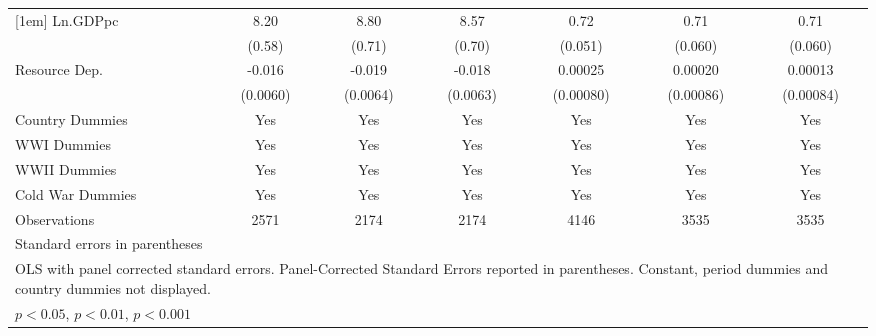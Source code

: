 \begin{table}[htbp]
{\begin{tabular}{l*{6}{c}}
			[1em]
			Ln.GDPpc            &        8.20\sym{***}&        8.80\sym{***}&        8.57\sym{***}&        0.72\sym{***}&        0.71\sym{***}&        0.71\sym{***}\\
			&      (0.58)         &      (0.71)         &      (0.70)         &     (0.051)         &     (0.060)         &     (0.060)         \\
			[1em]
			Resource Dep.       &      -0.016\sym{**} &      -0.019\sym{**} &      -0.018\sym{**} &     0.00025         &     0.00020         &     0.00013         \\
			&    (0.0060)         &    (0.0064)         &    (0.0063)         &   (0.00080)         &   (0.00086)         &   (0.00084)         \\
			[1em]
			Country Dummies     &         Yes         &         Yes         &         Yes         &         Yes         &         Yes         &         Yes         \\
			[1em]
			WWI Dummies         &         Yes         &         Yes         &         Yes         &         Yes         &         Yes         &         Yes         \\
			[1em]
			WWII Dummies        &         Yes         &         Yes         &         Yes         &         Yes         &         Yes         &         Yes         \\
			[1em]
			Cold War Dummies    &         Yes         &         Yes         &         Yes         &         Yes         &         Yes         &         Yes         \\
			\hline
			Observations        &        2571         &        2174         &        2174         &        4146         &        3535         &        3535         \\
			\hline\hline
			\multicolumn{7}{l}{\footnotesize Standard errors in parentheses}\\
			\multicolumn{7}{l}{\footnotesize OLS with panel corrected standard errors. Panel-Corrected Standard Errors reported in parentheses. Constant, period dummies and country dummies not displayed.}\\
			\multicolumn{7}{l}{\footnotesize \sym{*} \(p<0.05\), \sym{**} \(p<0.01\), \sym{***} \(p<0.001\)}\\
	\end{tabular}}
	\label{tab:table1}
\end{table}
